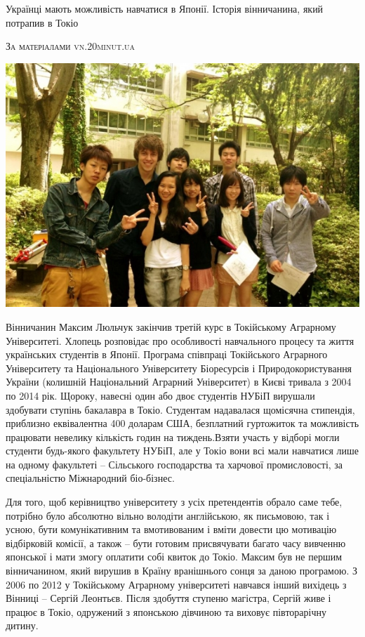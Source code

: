 \documentclass[10pt,a4paper]{article}
\newcommand{\NewsItem}[1]{%
		\usefont{T2A}{iwona}{m}{n} 
		\large #1 \vspace{4pt}
		\par \normalsize \normalfont}
\newcommand{\NewsAuthor}[1]{%
			\hfill \textsc{#1} \vspace{4pt}
			\par \normalfont}
\begin{document}
\begin{multicols}{3}

\NewsItem{Українці мають можливість навчатися в Японії. Історія вінничанина, який потрапив в Токіо}
\NewsAuthor{За матеріалами vn.20minut.ua}
\begin{center}
\includegraphics[width=0.8\linewidth]{images/10}
\end{center}
Вінничанин Максим Люльчук закінчив третій курс в Токійському Аграрному Університеті. Хлопець розповідає про особливості навчального процесу та життя українських студентів в Японії. Програма співпраці Токійського Аграрного Університету та Національного Університету Біоресурсів і Природокористування України (колишній Національний Аграрний Університет) в Києві тривала з 2004 по 2014 рік. Щороку, навесні один або двоє студентів НУБіП вирушали здобувати ступінь бакалавра в Токіо. Студентам надавалася щомісячна стипендія, приблизно еквівалентна 400 доларам США, безплатний гуртожиток та можливість працювати невелику кількість годин на тиждень.Взяти участь у відборі могли студенти будь-якого факультету НУБіП, але у Токіо вони всі мали навчатися лише на одному факультеті – Сільського господарства та харчової промисловості, за спеціальністю Міжнародний біо-бізнес.

Для того, щоб керівництво університету з усіх претендентів обрало саме тебе, потрібно було абсолютно вільно володіти англійською, як письмовою, так і усною, бути комунікативним та вмотивованим і вміти довести цю мотивацію відбірковій комісії, а також – бути готовим присвячувати багато часу вивченню японської і мати змогу оплатити собі квиток до Токіо. Максим був не першим вінничанином, який вирушив в Країну вранішнього сонця за даною програмою. З 2006 по 2012 у Токійському Аграрному університеті навчався інший вихідець з Вінниці – Сергій Леонтьєв. Після здобуття ступеню магістра, Сергій живе і працює в Токіо, одружений з японською дівчиною та виховує півторарічну дитину.


\end{multicols}
\end{document}
